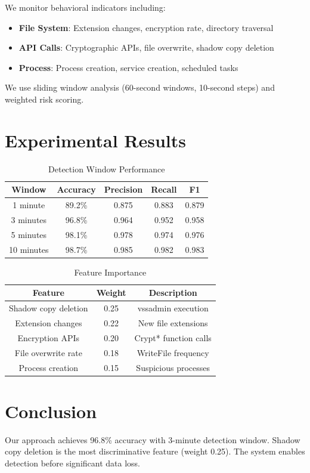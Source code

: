 \documentclass[conference]{IEEEtran}
\begin{document}
We monitor behavioral indicators including:
\begin{itemize}
\item \textbf{File System}: Extension changes, encryption rate, directory traversal
\item \textbf{API Calls}: Cryptographic APIs, file overwrite, shadow copy deletion
\item \textbf{Process}: Process creation, service creation, scheduled tasks
\end{itemize}

We use sliding window analysis (60-second windows, 10-second steps) and weighted risk scoring.

\section{Experimental Results}

\begin{table}[htbp]
\caption{Detection Window Performance}
\begin{center}
\begin{tabular}{|c|c|c|c|c|}
\hline
\textbf{Window} & \textbf{Accuracy} & \textbf{Precision} & \textbf{Recall} & \textbf{F1} \\
\hline
1 minute & 89.2\% & 0.875 & 0.883 & 0.879 \\
3 minutes & 96.8\% & 0.964 & 0.952 & 0.958 \\
5 minutes & 98.1\% & 0.978 & 0.974 & 0.976 \\
10 minutes & 98.7\% & 0.985 & 0.982 & 0.983 \\
\hline
\end{tabular}
\label{tab:windows}
\end{center}
\end{table}

\begin{table}[htbp]
\caption{Feature Importance}
\begin{center}
\begin{tabular}{|c|c|c|}
\hline
\textbf{Feature} & \textbf{Weight} & \textbf{Description} \\
\hline
Shadow copy deletion & 0.25 & vssadmin execution \\
Extension changes & 0.22 & New file extensions \\
Encryption APIs & 0.20 & Crypt* function calls \\
File overwrite rate & 0.18 & WriteFile frequency \\
Process creation & 0.15 & Suspicious processes \\
\hline
\end{tabular}
\label{tab:features}
\end{center}
\end{table}

\section{Conclusion}

Our approach achieves 96.8\% accuracy with 3-minute detection window. Shadow copy deletion is the most discriminative feature (weight 0.25). The system enables detection before significant data loss.
\end{document}
